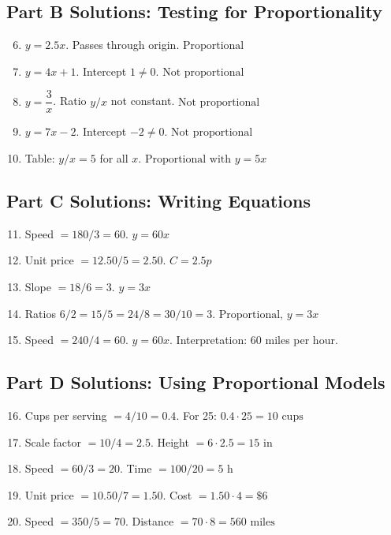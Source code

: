 \documentclass[12pt]{article}
\begin{document}
\subsection*{Part B Solutions: Testing for Proportionality}
\begin{enumerate}
  \setcounter{enumi}{5}
  \item \(y=2.5x\). Passes through origin. \(\boxed{\text{Proportional}}\)
  \item \(y=4x+1\). Intercept \(1\neq0\). \(\boxed{\text{Not proportional}}\)
  \item \(y=\dfrac{3}{x}\). Ratio \(y/x\) not constant. \(\boxed{\text{Not proportional}}\)
  \item \(y=7x-2\). Intercept \(-2\neq0\). \(\boxed{\text{Not proportional}}\)
  \item Table: \(y/x=5\) for all \(x\). \(\boxed{\text{Proportional with } y=5x}\)
\end{enumerate}

\subsection*{Part C Solutions: Writing Equations}
\begin{enumerate}
  \setcounter{enumi}{10}
  \item Speed \(=180/3=60\). \(\boxed{y=60x}\)
  \item Unit price \(=12.50/5=2.50\). \(\boxed{C=2.5p}\)
  \item Slope \(=18/6=3\). \(\boxed{y=3x}\)
  \item Ratios \(6/2=15/5=24/8=30/10=3\). \(\boxed{\text{Proportional, } y=3x}\)
  \item Speed \(=240/4=60\). \(\boxed{y=60x}\). Interpretation: 60 miles per hour.
\end{enumerate}

\subsection*{Part D Solutions: Using Proportional Models}
\begin{enumerate}
  \setcounter{enumi}{15}
  \item Cups per serving \(=4/10=0.4\). For 25: \(0.4\cdot25=\boxed{10\text{ cups}}\)
  \item Scale factor \(=10/4=2.5\). Height \(=6\cdot2.5=\boxed{15\text{ in}}\)
  \item Speed \(=60/3=20\). Time \(=100/20=\boxed{5\text{ h}}\)
  \item Unit price \(=10.50/7=1.50\). Cost \(=1.50\cdot4=\boxed{\$6}\)
  \item Speed \(=350/5=70\). Distance \(=70\cdot8=\boxed{560\text{ miles}}\)
\end{enumerate}
\end{document}
